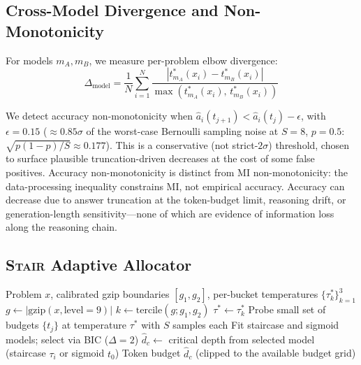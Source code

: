 \documentclass{article}
\newcommand{\method}{\textsc{Stair}}
\begin{document}
\subsection{Cross-Model Divergence and Non-Monotonicity}

For models $m_A, m_B$, we measure per-problem elbow divergence:
\begin{equation}
\Delta_{\text{model}} = \frac{1}{N}\sum_{i=1}^{N} \frac{|t^*_{m_A}(x_i) - t^*_{m_B}(x_i)|}{\max(t^*_{m_A}(x_i),\, t^*_{m_B}(x_i))}
\label{eq:divergence}
\end{equation}

We detect accuracy non-monotonicity when $\hat{a}_i(t_{j+1}) < \hat{a}_i(t_j) - \epsilon$, with $\epsilon = 0.15$ ($\approx 0.85\sigma$ of the worst-case Bernoulli sampling noise at $S{=}8$, $p{=}0.5$: $\sqrt{p(1{-}p)/S} \approx 0.177$).  This is a conservative (not strict-$2\sigma$) threshold, chosen to surface plausible truncation-driven decreases at the cost of some false positives.  Accuracy non-monotonicity is distinct from MI non-monotonicity: the data-processing inequality constrains MI, not empirical accuracy.  Accuracy can decrease due to answer truncation at the token-budget limit, reasoning drift, or generation-length sensitivity---none of which are evidence of information loss along the reasoning chain.

\subsection{\method{} Adaptive Allocator}

\begin{algorithm}[t]
\caption{\method{} Adaptive Inference Budget Allocation}
\label{alg:stair}
\begin{algorithmic}[1]
\REQUIRE Problem $x$, calibrated gzip boundaries $[g_1, g_2]$, per-bucket temperatures $\{\tau^*_k\}_{k=1}^{3}$
\STATE $g \leftarrow |\text{gzip}(x, \text{level}{=}9)|$ 
\STATE $k \leftarrow \text{tercile}(g; g_1, g_2)$ 
\STATE $\tau^* \leftarrow \tau^*_k$ 
\STATE Probe small set of budgets $\{t_j\}$ at temperature $\tau^*$ with $S$ samples each
\STATE Fit staircase and sigmoid models; select via BIC ($\Delta{=}2$)
\STATE $\hat{d}_c \leftarrow$ critical depth from selected model (staircase $\tau_i$ or sigmoid $t_0$)
\RETURN Token budget $\hat{d}_c$ (clipped to the available budget grid)
\end{algorithmic}
\end{algorithm}
\end{document}
